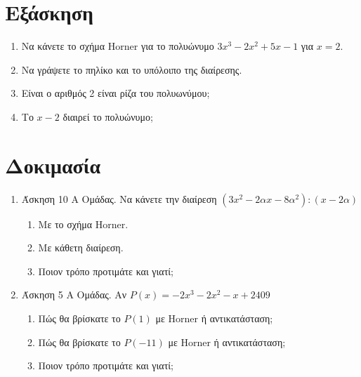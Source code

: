 \documentclass[a4paper,12pt]{article}
\begin{document}
\hspace{1cm}
\hspace{1cm}


\section{Εξάσκηση}

\begin{enumerate}
  \item Να κάνετε το σχήμα Horner για το πολυώνυμο $3x^3-2x^2+5x-1$ για $x = 2$.
        \vspace{3cm}
  \item Να γράψετε το πηλίκο και το υπόλοιπο της διαίρεσης.

        \vspace{1cm}
        \dotfill
  \item Είναι ο αριθμός 2 είναι ρίζα του πολυωνύμου;
  \item Το $x-2$ διαιρεί το πολυώνυμο;
\end{enumerate}

\section{Δοκιμασία}

\begin{enumerate}
  \item Άσκηση 10 Α Ομάδας. Να κάνετε την διαίρεση $(3x^2 - 2αx - 8α^2): (x - 2α)$
        \begin{enumerate}
          \item Με το σχήμα Horner.
          \item Με κάθετη διαίρεση.
          \item Ποιον τρόπο προτιμάτε και γιατί;
        \end{enumerate}
  \item Άσκηση 5 Α Ομάδας. Αν $P(x) = -2x^3 - 2x^2 - x + 2409$
        \begin{enumerate}
          \item Πώς θα βρίσκατε το $P(1)$ με Horner ή αντικατάσταση;
          \item Πώς θα βρίσκατε το $P(-11)$ με Horner ή αντικατάσταση;
          \item Ποιον τρόπο προτιμάτε και γιατί;
        \end{enumerate}
\end{enumerate}
\end{document}
